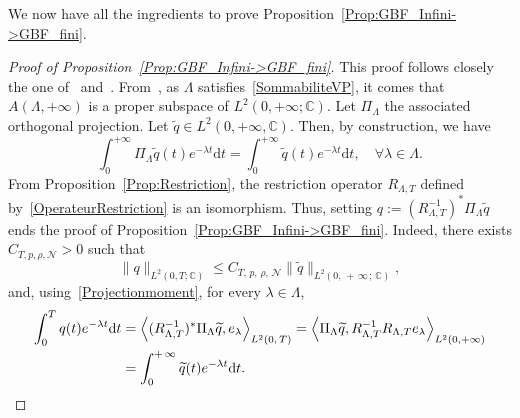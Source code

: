 \documentclass[10pt]{amsart}
\theoremstyle{definition}\newtheorem{defi}[theo]{Definition}\newtheorem{rema}[theo]{Remark}\newtheorem{exam}[theo]{Example}\newtheorem{exem}[theo]{Example}\newtheorem{nota}[theo]{Notation}
\newcommand{\NN}{\mathcal{N}}
\newcommand{\C}{\mathbb{C}}
\newcommand{\lag}{\langle}
\newcommand{\rag}{\rangle}
\newcommand{\md}{\mathrm{d}}
\let\oldforall\forall
\renewcommand*{\forall}{\mathrel{\oldforall}}
\begin{document}
We now have all the ingredients to prove Proposition~\ref{Prop:GBF_Infini->GBF_fini}.




\begin{proof}[Proof of Proposition~\ref{Prop:GBF_Infini->GBF_fini}]
This proof follows closely the one of~\cite[Section~4]{AKBGBDT_Kalman} and~\cite[Lemma~4.2]{AmmarKhodjaBenabdallahGonzalez-BurgosdeTeresa:2014}. From~\cite[Corollary~4.3]{AKBGBDT_Kalman}, as $\Lambda$ satisfies~\eqref{SommabiliteVP}, it comes that $A(\Lambda, +\infty)$ is a proper subspace of $L^2(0, +\infty ; \C)$. Let $\Pi_\Lambda$ the associated orthogonal projection. Let $\widetilde{q} \in L^2(0,+\infty, \C)$. Then, by construction, we have
\begin{equation}\label{Projectionmoment}
\int_0^{+\infty} \Pi_\Lambda \widetilde{q}(t) e^{-\lambda t} \md t = \int_0^{+\infty} \widetilde{q}(t) e^{-\lambda t} \md t,
\quad \forall \lambda\in \Lambda.
\end{equation}
From Proposition~\ref{Prop:Restriction}, the restriction operator $R_{\Lambda,T}$ defined by~\eqref{OperateurRestriction} is an isomorphism. Thus, setting $q := (R_{\Lambda,T}^{-1})^* \Pi_\Lambda \widetilde{q}$ ends the proof of Proposition~\ref{Prop:GBF_Infini->GBF_fini}. Indeed, there exists $C_{T,p,\rho,\NN}>0$ such that
\[
\| q \|_{L^2(0,T ; \C)} \leq C_{T,\,p,\,\rho,\,\NN} \| \widetilde{q} \|_{L^2(0,\,+\,\infty\,;\, \C)},
\]
and, using~\eqref{Projectionmoment}, for every $\lambda\in \Lambda$,
\begin{align*}
\int_0^T q(t) e^{-\lambda t} \md t &= \left\lag (R_{\Lambda,T}^{-1})^* \Pi_\Lambda\widetilde{q}, e_\lambda \right\rag_{L^2(0,\,T)} = \left\lag \Pi_\Lambda\widetilde{q}, R_{\Lambda,T}^{-1} R_{\Lambda,T} e_\lambda \right\rag_{L^2(0,+\infty)}
\\
&= \int_0^{+\,\infty} \widetilde{q}(t) e^{-\lambda t} \md t.\qedhere
\end{align*}
\end{proof}
\end{document}
